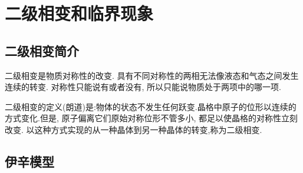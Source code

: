 
\section{二级相变和临界现象}
\subsection{二级相变简介}
    二级相变是物质对称性的改变. 具有不同对称性的两相无法像液态和气态之间发生连续的转变. 对称性只能说有或者没有, 所以只能说物质处于两项中的哪一项.

    二级相变的定义(朗道)是:物体的状态不发生任何跃变.晶格中原子的位形以连续的方式变化.但是, 原子偏离它们原始对称位形不管多小, 都足以使晶格的对称性立刻改变. 以这种方式实现的从一种晶体到另一种晶体的转变,称为二级相变.
\subsection{伊辛模型}
    
